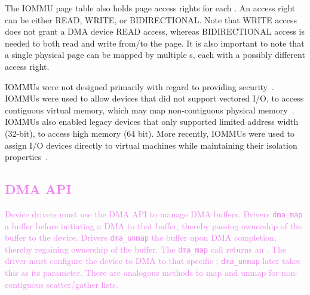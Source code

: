 The IOMMU page table also holds page access rights for each \iova. An access right can be either READ, WRITE, or BIDIRECTIONAL. Note that WRITE access does not grant a DMA device READ access, whereas BIDIRECTIONAL access is needed to both read and write from/to the page. It is also important to note that a single physical page can be mapped by multiple \iova{}s, each with a possibly different access right.

IOMMUs were not designed primarily with regard to providing security~\cite{DWT79}. IOMMUs were used to allow devices that did not support vectored I/O, to access contiguous virtual memory, which may map non-contiguous physical memory~\cite{Chu96, WMM97}. IOMMUs also enabled legacy devices that only supported limited address width (32-bit), to access high memory (64 bit). More recently, IOMMUs were used to assign I/O devices directly to virtual machines while maintaining their isolation properties~\cite{Int16b, AMD16}. 
\textcolor{violet}{\subsection{DMA API}
Device drivers must use the DMA API to manage DMA buffers. Drivers \texttt{dma\_map} a buffer before initiating a DMA to that buffer, thereby passing ownership of
the buffer to the device. Drivers \texttt{dma\_unmap} the buffer upon
DMA completion, thereby regaining ownership of the buffer.
The \texttt{dma\_map} call returns an \iova. The driver must configure the device to DMA to that specific \iova;
\texttt{dma\_unmap} later takes this \iova as its parameter. There are analogous methods to map and unmap for non-contiguous scatter/gather lists.}